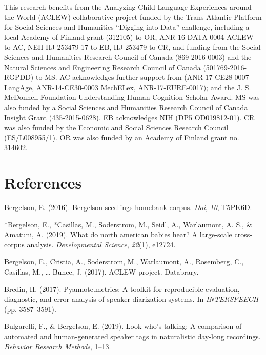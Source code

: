\documentclass[english,table,man,floatsintext]{apa6}
\begin{document}
This research benefits from the Analyzing Child Language Experiences around the World (ACLEW) collaborative project funded by the Trans-Atlantic Platform for Social Sciences and Humanities \enquote{Digging into Data} challenge, including a local Academy of Finland grant (312105) to OR, ANR-16-DATA-0004 ACLEW to AC, NEH HJ-253479-17 to EB, HJ-253479 to CR, and funding from the Social Sciences and Humanities Research Council of Canada (869-2016-0003) and the Natural Sciences and Engineering Research Council of Canada (501769-2016-RGPDD) to MS. AC acknowledges further support from (ANR-17-CE28-0007 LangAge, ANR-14-CE30-0003 MechELex, ANR-17-EURE-0017); and the J. S. McDonnell Foundation Understanding Human Cognition Scholar Award. MS was also funded by a Social Sciences and Humanities Research Council of Canada Insight Grant (435-2015-0628). EB acknowledges NIH (DP5 OD019812-01). CR was also funded by the Economic and Social Sciences Research Council (ES/L008955/1). OR was also funded by an Academy of Finland grant no. 314602.

\newpage

\hypertarget{references}{%
\section{References}\label{references}}

\setlength{\parindent}{-0.5in}
\setlength{\leftskip}{0.5in}

\hypertarget{refs}{}
\leavevmode\hypertarget{ref-bergelson2016bergelson}{}%
Bergelson, E. (2016). Bergelson seedlings homebank corpus. \emph{Doi}, \emph{10}, T5PK6D.

\leavevmode\hypertarget{ref-bergelson2019north}{}%
*Bergelson, E., *Casillas, M., Soderstrom, M., Seidl, A., Warlaumont, A. S., \& Amatuni, A. (2019). What do north american babies hear? A large-scale cross-corpus analysis. \emph{Developmental Science}, \emph{22}(1), e12724.

\leavevmode\hypertarget{ref-bergelson2017}{}%
Bergelson, E., Cristia, A., Soderstrom, M., Warlaumont, A., Rosemberg, C., Casillas, M., \ldots{} Bunce, J. (2017). ACLEW project. Databrary.

\leavevmode\hypertarget{ref-bredin2017pyannote}{}%
Bredin, H. (2017). Pyannote.metrics: A toolkit for reproducible evaluation, diagnostic, and error analysis of speaker diarization systems. In \emph{INTERSPEECH} (pp. 3587--3591).

\leavevmode\hypertarget{ref-bulgarelli2019}{}%
Bulgarelli, F., \& Bergelson, E. (2019). Look who's talking: A comparison of automated and human-generated speaker tags in naturalistic day-long recordings. \emph{Behavior Research Methods}, 1--13.
\end{document}
